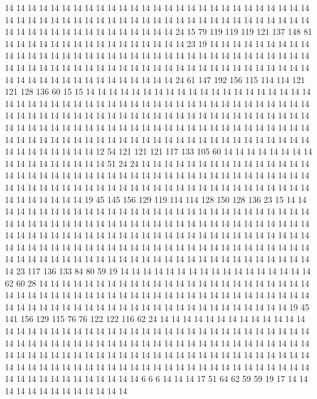 14 14 14 14 14 14 14 14 14 14 14 14 14 14 14 14 14 14 14 14
14 14 14 14 14 14 14 14 14 14 14 14 14 14 14 14 14 14 14 14
14 14 14 14 14 14 14 14 14 14 14 14 14 14 14 14 14 14 14 14
14 14 14 14 14 14 14 14 14 24 15 79 119 119 119 121 137 148 81 14
14 14 14 14 14 14 14 14 14 14 14 14 14 14 14 23 19 14 14 14
14 14 14 14 14 14 14 14 14 14 14 14 14 14 14 14 14 14 14 14
14 14 14 14 14 14 14 14 14 14 14 14 14 14 14 14 14 14 14 14
14 14 14 14 14 14 14 14 14 14 14 14 14 14 14 14 14 14 14 14
14 14 14 14 14 14 14 14 14 14 14 14 14 14 14 24 61 147 192 156
115 114 114 121 121 128 136 60 15 15 14 14 14 14 14 14 14 14 14 14
14 14 14 14 14 14 14 14 14 14 14 14 14 14 14 14 14 14 14 14
14 14 14 14 14 14 14 14 14 14 14 14 14 14 14 14 14 14 14 14
14 14 14 14 14 14 14 14 14 14 14 14 14 14 14 14 14 14 14 14
14 14 14 14 14 14 14 14 14 14 14 14 14 14 14 14 14 14 14 14
14 14 14 14 14 14 14 14 14 14 14 14 14 14 14 14 14 14 14 14
14 14 14 14 14 14 14 14 14 14 14 14 14 14 14 14 14 14 14 14
14 14 14 14 14 14 12 54 121 121 121 117 133 105 60 14 14 14 14 14
14 14 14 14 14 14 14 14 14 14 14 14 51 24 24 14 14 14 14 14
14 14 14 14 14 14 14 14 14 14 14 14 14 14 14 14 14 14 14 14
14 14 14 14 14 14 14 14 14 14 14 14 14 14 14 14 14 14 14 14
14 14 14 14 14 14 14 14 14 14 14 14 14 14 14 14 14 14 14 14
14 14 14 14 14 14 14 14 14 14 14 19 45 145 156 129 119 114 114 128
150 128 136 23 15 14 14 14 14 14 14 14 14 14 14 14 14 14 14 14
14 14 14 14 14 14 14 14 14 14 14 14 14 14 14 14 14 14 14 14
14 14 14 14 14 14 14 14 14 14 14 14 14 14 14 14 14 14 14 14
14 14 14 14 14 14 14 14 14 14 14 14 14 14 14 14 14 14 14 14
14 14 14 14 14 14 14 14 14 14 14 14 14 14 14 14 14 14 14 14
14 14 14 14 14 14 14 14 14 14 14 14 14 14 14 14 14 14 14 14
14 14 14 14 14 14 14 14 14 14 14 14 14 14 14 14 14 14 14 14
14 14 14 23 117 136 133 84 80 59 19 14 14 14 14 14 14 14 14 14
14 14 14 14 14 14 14 14 62 60 28 14 14 14 14 14 14 14 14 14
14 14 14 14 14 14 14 14 14 14 14 14 14 14 14 14 14 14 14 14
14 14 14 14 14 14 14 14 14 14 14 14 14 14 14 14 14 14 14 14
14 14 14 14 14 14 14 14 14 14 14 14 14 14 14 14 14 14 14 14
14 14 14 14 14 14 14 19 45 141 156 129 115 76 76 122 122 116 62 24
14 14 14 14 14 14 14 14 14 14 14 14 14 14 14 14 14 14 14 14
14 14 14 14 14 14 14 14 14 14 14 14 14 14 14 14 14 14 14 14
14 14 14 14 14 14 14 14 14 14 14 14 14 14 14 14 14 14 14 14
14 14 14 14 14 14 14 14 14 14 14 14 14 14 14 14 14 14 14 14
14 14 14 14 14 14 14 14 14 14 14 14 14 14 14 14 14 14 14 14
14 14 14 14 14 14 14 14 14 14 14 14 14 14 14 14 14 14 14 14
14 14 14 14 14 14 14 14 14 14 14 14 14 6 6 6 14 14 14 17
51 64 62 59 59 19 17 14 14 14 14 14 14 14 14 14 14 14 14 14
